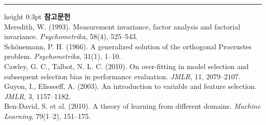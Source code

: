 \documentclass[10pt]{article}
\begin{document}
\vspace{0.6em}
\hrule height 0.3pt
\vspace{0.5em}
{\footnotesize
\textbf{참고문헌}\\[0.3em]
Meredith, W. (1993). Measurement invariance, factor analysis and factorial
invariance. \emph{Psychometrika}, 58(4), 525--543.\\[0.15em]
Schönemann, P. H. (1966). A generalized solution of the orthogonal Procrustes
problem. \emph{Psychometrika}, 31(1), 1--10.\\[0.15em]
Cawley, G. C., Talbot, N. L. C. (2010). On over-fitting in model selection and
subsequent selection bias in performance evaluation. \emph{JMLR}, 11, 2079--2107.\\[0.15em]
Guyon, I., Elisseeff, A. (2003). An introduction to variable and feature selection.
\emph{JMLR}, 3, 1157--1182.\\[0.15em]
Ben-David, S. et al. (2010). A theory of learning from different domains.
\emph{Machine Learning}, 79(1--2), 151--175.
}
\end{document}
